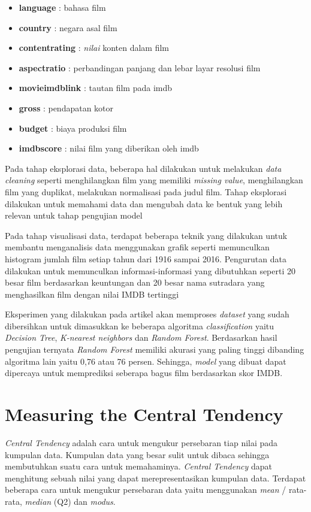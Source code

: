 \begin{itemize}
\item \textbf{language} : bahasa film 
\item \textbf{country} : negara asal film 
\item \textbf{content\textunderscore rating} : \textit{nilai} konten dalam film 
\item \textbf{aspect\textunderscore ratio} : perbandingan panjang dan lebar layar resolusi film 
\item \textbf{movie\textunderscore imdb\textunderscore link} : tautan film pada imdb 
\item \textbf{gross} : pendapatan kotor 
\item \textbf{budget} : biaya produksi film 
\item \textbf{imdb\textunderscore score} : nilai film yang diberikan oleh imdb 
\end{itemize}

Pada tahap eksplorasi data, beberapa hal dilakukan untuk melakukan \textit{data cleaning} seperti menghilangkan film yang memiliki \textit{missing value}, menghilangkan film yang duplikat, melakukan normalisasi pada judul film. Tahap  eksplorasi dilakukan untuk memahami data dan mengubah data ke bentuk yang lebih relevan untuk tahap pengujian model

Pada tahap visualisasi data, terdapat beberapa teknik yang dilakukan untuk membantu menganalisis data menggunakan grafik seperti memunculkan histogram jumlah film setiap tahun dari 1916 sampai 2016. Pengurutan data dilakukan untuk memunculkan informasi-informasi yang dibutuhkan seperti 20 besar film 
berdasarkan keuntungan dan 20 besar nama sutradara yang menghasilkan film dengan nilai IMDB tertinggi

Eksperimen yang dilakukan pada artikel akan memproses \textit{dataset} yang sudah dibersihkan untuk dimasukkan ke beberapa algoritma \textit{classification} yaitu \textit{Decision Tree}, \textit{K-nearest neighbors} dan \textit{Random Forest}. Berdasarkan hasil pengujian ternyata \textit{Random Forest} memiliki akurasi yang paling tinggi dibanding algoritma lain yaitu 0,76 atau 76 persen. Sehingga, \textit{model} yang dibuat dapat dipercaya untuk memprediksi seberapa bagus film berdasarkan skor IMDB.		

\section{Measuring the Central Tendency  \cite{han2012mining}}\textit{Central Tendency}
 adalah cara untuk mengukur persebaran tiap nilai pada kumpulan data. Kumpulan data yang besar sulit untuk dibaca sehingga membutuhkan suatu cara untuk memahaminya.  \textit{Central Tendency} dapat menghitung sebuah nilai yang dapat merepresentasikan kumpulan data. Terdapat beberapa cara untuk mengukur persebaran data yaitu menggunakan \textit{mean} / rata-rata, \textit{median} (Q2) dan \textit{modus}.  

